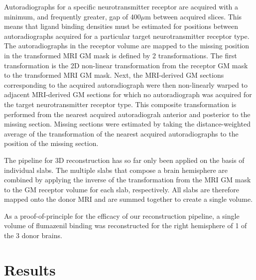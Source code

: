\documentclass[12pt]{article}
\begin{document}
Autoradiographs for a specific neurotransmitter receptor are acquired with a minimum, and frequently greater, gap of 400$\mu$m between acquired slices. This means that ligand binding densities must be estimated for positions between autoradiographs acquired for a particular target neurotransmitter receptor type. The autoradiographs in the receptor volume are mapped to the missing position in the transformed MRI GM mask is defined by 2 transformations. The first transformation is the 2D non-linear transformation from the receptor GM mask to the transformed MRI GM mask. Next, the MRI-derived GM sections corresponding to the acquired autoradiograph were then non-linearly warped to adjacent MRI-derived GM sections for which no autoradiograph was acquired for the target neurotransmitter receptor type. This composite transformation is performed from the nearest acquired autoradiograh anterior and posterior to the missing section. Missing sections were estimated by taking the distance-weighted average of the transformation of the nearest acquired autoradiographs to the position of the missing section. 

The pipeline for 3D reconstruction has so far only been applied on the basis of individual slabs. The multiple slabs that compose a brain hemisphere are combined by applying the inverse of the transformation from the MRI GM mask to the GM receptor volume for each slab, respectively. All slabs are therefore mapped onto the donor MRI and are summed together to create a single volume. 

As a proof-of-principle for the efficacy of our reconstruction pipeline, a single volume of flumazenil binding was reconstructed for the right hemisphere of 1 of the 3 donor brains. 

\section{Results}



\Discussion{}




\end{document}
